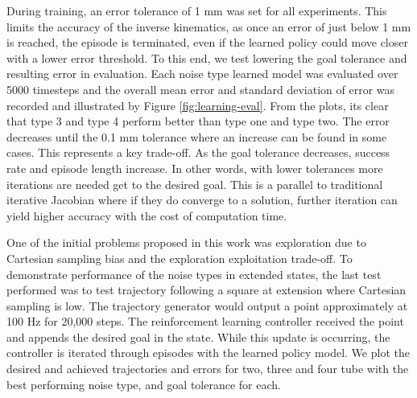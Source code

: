 During training, an error tolerance of 1 mm was set for all experiments. This limits the accuracy of the inverse kinematics, as once an error of just below 1 mm is reached, the episode is terminated, even if the learned policy could move closer with a lower error threshold. To this end, we test lowering the goal tolerance and resulting error in evaluation. Each noise type learned model was evaluated over 5000 timesteps and the overall mean error and standard deviation of error was recorded and illustrated by Figure \ref{fig:learning-eval}. From the plots, its clear that type 3 and type 4 perform better than type one and type two. The error decreases until the 0.1 mm tolerance where an increase can be found in some cases. This represents a key trade-off. As the goal tolerance decreases, success rate and episode length increase. In other words, with lower tolerances more iterations are needed get to the desired goal. This is a parallel to traditional iterative Jacobian where if they do converge to a solution, further iteration can yield higher accuracy with the cost of computation time.

One of the initial problems proposed in this work was exploration due to Cartesian sampling bias and the exploration exploitation trade-off. To demonstrate performance of the noise types in extended states, the last test performed was to test trajectory following a square at extension where Cartesian sampling is low. The trajectory generator would output a point approximately at 100 Hz for 20,000 steps. The reinforcement learning controller received the point and appends the desired goal in the state. While this update is occurring, the controller is iterated through episodes with the learned policy model. We plot the desired and achieved trajectories and errors for two, three and four tube with the best performing noise type, and goal tolerance for each.

